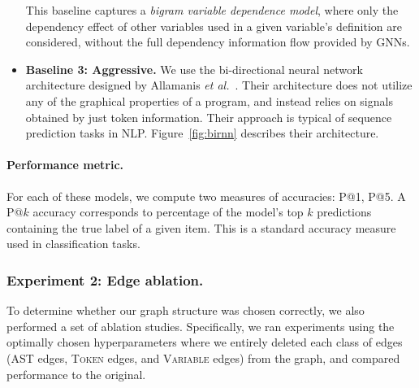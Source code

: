 \begin{itemize}[noitemsep,topsep=0pt]
  This baseline captures a \textit{bigram variable dependence model}, where only the dependency effect of other variables used in a given variable's definition are considered, without the full dependency information flow provided by GNNs.
\item \textbf{Baseline 3: Aggressive.}
  We use the bi-directional neural network architecture designed by Allamanis \textit{et al.}~\cite{hellendoorn2018deep}.
  Their architecture does not utilize any of the graphical properties of a program, and instead relies on signals obtained by just token information.
  Their approach is typical of sequence prediction tasks in NLP.
  Figure~\ref{fig:birnn} describes their architecture.
\end{itemize}

\paragraph{Performance metric.}
For each of these models, we compute two measures of accuracies: \textsc{P@1}, \textsc{P@5}.
A \textsc{P@}$k$ accuracy corresponds to percentage of the model's top $k$ predictions containing the true label of a given item.
This is a standard accuracy measure used in classification tasks.

\subsubsection{Experiment 2: Edge ablation.}
To determine whether our graph structure was chosen correctly, we also performed a set of ablation studies.
Specifically, we ran experiments using the optimally chosen hyperparameters where we entirely deleted each class of edges (AST edges, \textsc{Token} edges, and \textsc{Variable} edges) from the graph, and compared performance to the original.

